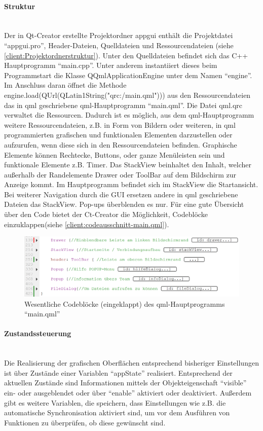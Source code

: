 \paragraph{Struktur}$\;$\\
Der in Qt-Creator erstellte Projektordner app\textunderscore gui enthält die Projektdatei "`app\textunderscore gui.pro"', Header-Dateien, Quelldateien und Ressourcendateien (siehe \autoref{client:Projektordnerstruktur}). Unter den Quelldateien befindet sich das C++ Hauptprogramm "`main.cpp"'. Unter anderem instantiiert dieses beim Programmstart die Klasse QQmlApplicationEngine unter dem Namen "`engine"'. Im Anschluss daran öffnet die Methode engine.load(QUrl(QLatin1String("qrc:/main.qml"))) aus den Ressourcendateien das in qml geschriebene qml-Hauptprogramm "`main.qml"'. Die Datei qml.qrc verwaltet die Ressourcen. Dadurch ist es möglich, aus dem qml-Hauptprogramm weitere Ressourcendateien, z.B. in Form von Bildern oder weiteren, in qml programmierten grafischen und funktionalen Elementen darzustellen oder aufzurufen, wenn diese sich in den Ressourcendateien befinden. Graphische Elemente können Rechtecke, Buttons, oder ganze Menüleisten sein und funktionale Elemente z.B. Timer.
Das StackView beinhaltet den Inhalt, welcher außerhalb der Randelemente Drawer oder ToolBar auf dem Bildschirm zur Anzeige kommt. Im Hauptprogramm befindet sich im StackView die Startansicht. Bei weiterer Navigation durch die GUI ersetzen andere in qml geschriebene Dateien das StackView. Pop-ups überblenden es nur.
Für eine gute Übersicht über den Code bietet der Ct-Creator die Möglichkeit, Codebl\"ocke einzuklappen(siehe \autoref{client:codeausschnitt-main.qml}).

\begin{figure}[ht!]
	\centering
	\includegraphics[scale=0.8]{GUI/Bilder/qml-main-Codeausschnitt.PNG}
	\caption{Wesentliche Codebl\"ocke (eingeklappt) des qml-Hauptprogramms "`main.qml"' {\tiny}}
	\label{client:codeausschnitt-main.qml}
\end{figure}

\paragraph{Zustandssteuerung}$\;$\\
Die Realisierung der grafischen Oberflächen entsprechend bisheriger Einstellungen ist über Zustände einer Variablen "`appState"' realisiert. Entsprechend der aktuellen Zustände sind Informationen mittels der Objekteigenschaft "`visible"' ein- oder ausgeblendet oder über "`enable"' aktiviert oder deaktiviert. Außerdem gibt es weitere Variablen, die speichern, dass Einstellungen wie z.B. die automatische Synchronisation aktiviert sind, um vor dem Ausführen von Funktionen zu überprüfen, ob diese gewünscht sind.

